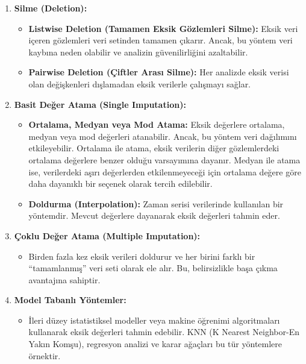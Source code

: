 \documentclass[
  letterpaper,
  DIV=11,
  numbers=noendperiod]{scrreprt}
\providecommand{\tightlist}{%
  \setlength{\itemsep}{0pt}\setlength{\parskip}{0pt}}
\begin{document}
\begin{enumerate}
\def\labelenumi{\arabic{enumi}.}
\item
  \textbf{Silme (Deletion):}

  \begin{itemize}
  \item
    \textbf{Listwise Deletion (Tamamen Eksik Gözlemleri Silme):} Eksik
    veri içeren gözlemleri veri setinden tamamen çıkarır. Ancak, bu
    yöntem veri kaybına neden olabilir ve analizin güvenilirliğini
    azaltabilir.
  \item
    \textbf{Pairwise Deletion (Çiftler Arası Silme):} Her analizde eksik
    verisi olan değişkenleri dışlamadan eksik verilerle çalışmayı
    sağlar.
  \end{itemize}
\item
  \textbf{Basit Değer Atama (Single Imputation):}

  \begin{itemize}
  \item
    \textbf{Ortalama, Medyan veya Mod Atama:} Eksik değerlere ortalama,
    medyan veya mod değerleri atanabilir. Ancak, bu yöntem veri
    dağılımını etkileyebilir. Ortalama ile atama, eksik verilerin diğer
    gözlemlerdeki ortalama değerlere benzer olduğu varsayımına dayanır.
    Medyan ile atama ise, verilerdeki aşırı değerlerden etkilenmeyeceği
    için ortalama değere göre daha dayanıklı bir seçenek olarak tercih
    edilebilir.
  \item
    \textbf{Doldurma (Interpolation):} Zaman serisi verilerinde
    kullanılan bir yöntemdir. Mevcut değerlere dayanarak eksik değerleri
    tahmin eder.
  \end{itemize}
\item
  \textbf{Çoklu Değer Atama (Multiple Imputation):}

  \begin{itemize}
  \tightlist
  \item
    Birden fazla kez eksik verileri doldurur ve her birini farklı bir
    ``tamamlanmış'' veri seti olarak ele alır. Bu, belirsizlikle başa
    çıkma avantajına sahiptir.
  \end{itemize}
\item
  \textbf{Model Tabanlı Yöntemler:}

  \begin{itemize}
  \tightlist
  \item
    İleri düzey istatistiksel modeller veya makine öğrenimi
    algoritmaları kullanarak eksik değerleri tahmin edebilir. KNN (K
    Nearest Neighbor-En Yakın Komşu), regresyon analizi ve karar
    ağaçları bu tür yöntemlere örnektir.
  \end{itemize}
\end{enumerate}
\end{document}
